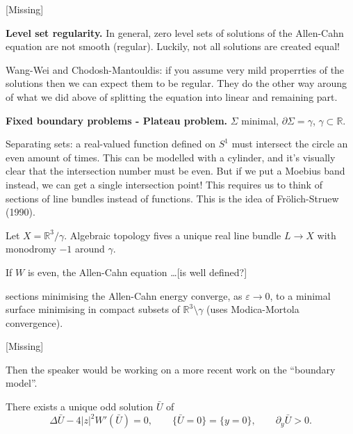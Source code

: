 \begin{theorem}
\label{theorem-cm}
[Missing]
\end{theorem}


\medskip\noindent
{\bf Level set regularity.}
In general, zero level sets of solutions
of the Allen-Cahn equation are not smooth
(regular). Luckily, not all solutions are
created equal!

Wang-Wei and Chodosh-Mantouldis: if you assume very mild properrties
of the solutions then we can expect them to
be regular. They do the other way aroung
of what we did above of splitting
the equation into linear and remaining part.

\medskip\noindent
{\bf Fixed boundary problems -
Plateau problem.}
 $\Sigma$ minimal, $\partial \Sigma =
\gamma$,
$\gamma \subset \mathbb{R}$.

Separating sets: a real-valued
function defined on $S^1$ must intersect
the circle an even amount of times.
This can be modelled with a cylinder,
and it's visually clear that the intersection
number must be even.
But if we put a Moebius band instead,
we can get a single intersection point!
This requires us to think of sections
of line bundles instead of functions.
This is the idea of Frölich-Struew (1990).

Let $X = \mathbb{R}^3/\gamma$. Algebraic
topology fives a unique real line bundle $L
\to X$ with monodromy $-1$ around $\gamma$.

If $W$ is even, the Allen-Cahn equation
…[is well defined?]

\begin{theorem}[FS]
\label{theorem-fs}
sections minimising the Allen-Cahn
energy converge, as $\varepsilon \to 0$,
to a minimal surface minimising in compact
subsets of $\mathbb{R}^3\setminus \gamma$
(uses Modica-Mortola convergence).
\end{theorem}

\begin{theorem}[G-Lynch, 2024]
\label{theorem-g-lynch}
[Missing]
\end{theorem}

\noindent
Then the speaker would be working
on a more recent work on the
``boundary model''.

\begin{theorem}
\label{theorem-bdpg}
There exists a unique odd solution
$\bar{U}$ of 
$$
\Delta \bar{U}
-4 |z|^2 W'(\bar{U})=0,\qquad 
\{\bar{U}=0\}=
\{y=0\},\qquad 
\partial_y \bar{U}>0.
$$
\end{theorem}

